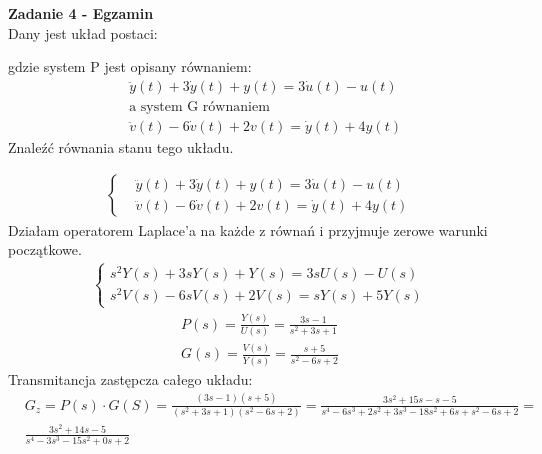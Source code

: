 \documentclass[a4paper,11pt]{article}
\begin{document}
\newpage
\begin{framed}
\textbf{Zadanie 4 - Egzamin} \\ 
Dany jest układ postaci:
\begin{figure}[H]
\centering
{}
\label{fig:opt_par_1}
\end{figure}
gdzie system P jest opisany równaniem:
\begin{align*}
&\ddot{y}(t)+3\dot{y}(t)+y(t)=3\dot{u}(t)-u(t) \\
&\text{a system G równaniem} \\
&\ddot{v}(t)-6\dot{v}(t)+2v(t)=\dot{y}(t)+4y(t)
\end{align*}
Znaleźć równania stanu tego układu.
\end{framed}
\begin{align*}
\begin{cases}
&\ddot{y}(t)+3\dot{y}(t)+y(t)=3\dot{u}(t)-u(t) \\
&\ddot{v}(t)-6\dot{v}(t)+2v(t)=\dot{y}(t)+4y(t)
\end{cases}
\end{align*}
Działam operatorem Laplace'a na każde z równań i przyjmuje zerowe warunki początkowe.
\begin{align*}
\begin{cases}
s^{2}Y(s)+3sY(s)+Y(s)=3sU(s)-U(s) \\
s^{2}V(s)-6sV(s)+2V(s)=sY(s)+5Y(s)
\end{cases}
\end{align*}
\begin{align*}
P(s) = \frac{Y(s)}{U(s)}=\frac{3s-1}{s^2+3s+1} \\
G(s) = \frac{V(s)}{Y(s)}=\frac{s+5}{s^2-6s+2}
\end{align*}
Transmitancja zastępcza całego układu:
\begin{align*}
&G_z = P(s)\cdot G(S) = \frac{(3s-1)(s+5)}{(s^2+3s+1)(s^2-6s+2)} =
\frac{3s^2+15s-s-5}{s^4-6s^3+2s^2+3s^3-18s^2+6s+s^2-6s+2} = \\
&\frac{3s^2+14s-5}{s^4-3s^3-15s^2+0s+2}
\end{align*}
\end{document}
